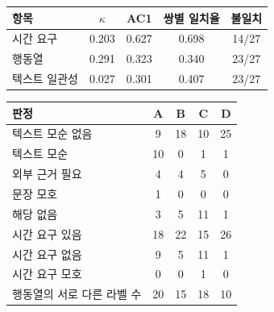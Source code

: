 \begin{table}[t]
\centering
\color{revisionblue}
\label{tab:agreement}
\footnotesize
\begin{tabularx}{\columnwidth}{Ycccc}
\toprule
항목 & $\kappa$ & AC1 & 쌍별 일치율 & 불일치 \\
\midrule
시간 요구 & 0.203 & 0.627 & 0.698 & 14/27 \\
행동열 & 0.291 & 0.323 & 0.340 & 23/27 \\
텍스트 일관성 & 0.027 & 0.301 & 0.407 & 23/27 \\
\bottomrule
\end{tabularx}
\end{table}
\begin{table}[t]
\centering
\color{revisionblue}
\label{tab:reviewer-distribution}
\footnotesize
\begin{tabularx}{\columnwidth}{Ycccc}
\toprule
판정 & A & B & C & D \\
\midrule
텍스트 모순 없음 & 9 & 18 & 10 & 25 \\
텍스트 모순 & 10 & 0 & 1 & 1 \\
외부 근거 필요 & 4 & 4 & 5 & 0 \\
문장 모호 & 1 & 0 & 0 & 0 \\
해당 없음 & 3 & 5 & 11 & 1 \\
\midrule
시간 요구 있음 & 18 & 22 & 15 & 26 \\
시간 요구 없음 & 9 & 5 & 11 & 1 \\
시간 요구 모호 & 0 & 0 & 1 & 0 \\
행동열의 서로 다른 라벨 수 & 20 & 15 & 18 & 10 \\
\bottomrule
\end{tabularx}
\end{table}
